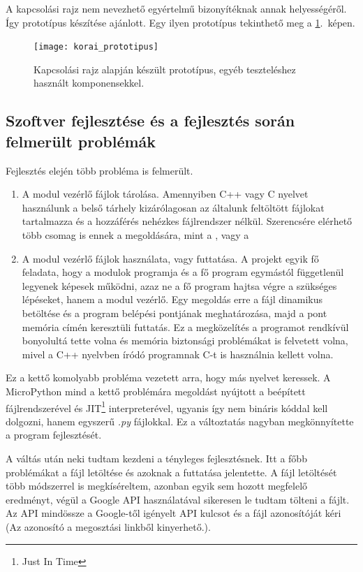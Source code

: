 \documentclass{thesis-ekf}
\theoremstyle{definition}
\theoremstyle{remark}
\begin{document}
	A kapcsolási rajz nem nevezhető egyértelmű bizonyítéknak annak helyességéről. Így prototípus készítése ajánlott. Egy ilyen prototípus tekinthető meg a \ref{img_proto}.~képen.
	\begin{figure}[!ht]
		\centering
		\texttt{[image: korai\_prototipus]}
		\caption{Kapcsolási rajz alapján készült prototípus, egyéb teszteléshez használt komponensekkel.}
		\label{img_proto}
	\end{figure}
	\subsection{Szoftver fejlesztése és a fejlesztés során felmerült problémák}
	\label{sub_fejlESP}
	Fejlesztés elején több probléma is felmerült.
	\begin{enumerate}
		\item A modul vezérlő fájlok tárolása. Amennyiben C++ vagy C nyelvet használunk a belső tárhely kizárólagosan az általunk feltöltött fájlokat tartalmazza és a hozzáférés nehézkes fájlrendszer nélkül. Szerencsére elérhető több csomag is ennek a megoldására, mint a \href{https://github.com/littlefs-project/littlefs}{\color{blue}{LittleFS}}, vagy a \href{https://docs.espressif.com/projects/esp-idf/en/stable/esp32/api-reference/storage/spiffs.html}{\color{blue}{Spiffs}}
		\item A modul vezérlő fájlok használata, vagy futtatása. A projekt egyik fő feladata, hogy a modulok programja és a fő program egymástól függetlenül legyenek képesek működni, azaz ne a fő program hajtsa végre a szükséges lépéseket, hanem a modul vezérlő. Egy megoldás erre a fájl dinamikus betöltése és a program belépési pontjának meghatározása, majd a pont memória címén keresztüli futtatás. Ez a megközelítés a programot rendkívül bonyolultá tette volna és memória biztonsági problémákat is felvetett volna, mivel a C++ nyelvben íródó programnak C-t is használnia kellett volna.
	\end{enumerate}
	 Ez a kettő komolyabb probléma vezetett arra, hogy más nyelvet keressek. A MicroPython mind a kettő problémára megoldást nyújtott a beépített fájlrendszerével és JIT\footnote{Just In Time} interpreterével, ugyanis így nem bináris kóddal kell dolgozni, hanem egyszerű \textit{.py} fájlokkal.
	 Ez a változtatás nagyban megkönnyítette a program fejlesztését.
	 
	 A váltás után neki tudtam kezdeni a tényleges fejlesztésnek. Itt a főbb problémákat a fájl letöltése és azoknak a futtatása jelentette. A fájl letöltését több módszerrel is megkíséreltem, azonban egyik sem hozott megfelelő eredményt, végül a Google API használatával sikeresen le tudtam tölteni a fájlt. Az API mindössze a Google-től igényelt API kulcsot és a fájl azonosítóját kéri (Az azonosító a megosztási linkből kinyerhető.).
	 
\end{document}
